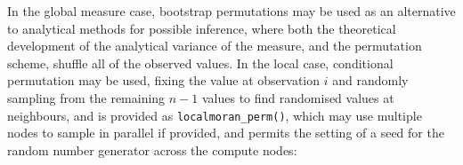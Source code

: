 \documentclass[]{book}
\newenvironment{Shaded}{\begin{snugshade}}{\end{snugshade}}
\newcommand{\CommentTok}[1]{\textcolor[rgb]{0.56,0.35,0.01}{\textit{#1}}}
\newcommand{\ControlFlowTok}[1]{\textcolor[rgb]{0.13,0.29,0.53}{\textbf{#1}}}
\newcommand{\DataTypeTok}[1]{\textcolor[rgb]{0.13,0.29,0.53}{#1}}
\newcommand{\DecValTok}[1]{\textcolor[rgb]{0.00,0.00,0.81}{#1}}
\newcommand{\FloatTok}[1]{\textcolor[rgb]{0.00,0.00,0.81}{#1}}
\newcommand{\KeywordTok}[1]{\textcolor[rgb]{0.13,0.29,0.53}{\textbf{#1}}}
\newcommand{\NormalTok}[1]{#1}
\newcommand{\OperatorTok}[1]{\textcolor[rgb]{0.81,0.36,0.00}{\textbf{#1}}}
\newcommand{\OtherTok}[1]{\textcolor[rgb]{0.56,0.35,0.01}{#1}}
\newcommand{\StringTok}[1]{\textcolor[rgb]{0.31,0.60,0.02}{#1}}
\begin{document}
\begin{Shaded}
\end{Shaded}

In the global measure case, bootstrap permutations may be used as an alternative to analytical methods for possible inference, where both the theoretical development of the analytical variance of the measure, and the permutation scheme, shuffle all of the observed values. In the local case, conditional permutation may be used, fixing the value at observation \(i\) and randomly sampling from the remaining \(n-1\) values to find randomised values at neighbours, and is provided as \texttt{localmoran\_perm()}, which may use multiple nodes to sample in parallel if provided, and permits the setting of a seed for the random number generator across the compute nodes:

\begin{Shaded}
\end{Shaded}
\end{document}
